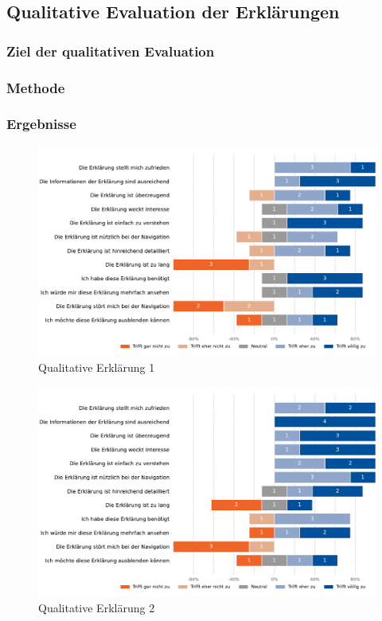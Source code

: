 \subsection{Qualitative Evaluation der Erklärungen}
\label{sec:study_results_qualitativ}

\subsubsection{Ziel der qualitativen Evaluation}

\subsubsection{Methode}

\subsubsection{Ergebnisse}

\begin{figure}[htb!]
    \centering
    \includegraphics[width=\linewidth]{contents/06_model_evaluation/02_evaluation/res/qualitativeFeedback-01_collaborative_routing.pdf}
    \caption{Qualitative Erklärung 1}
    \label{fig:qualitative_evaluation_explanation1}
\end{figure}

\begin{figure}[htb!]
    \centering
    \includegraphics[width=\linewidth]{contents/06_model_evaluation/02_evaluation/res/qualitativeFeedback-02_collaborative_algorithm.pdf}
    \caption{Qualitative Erklärung 2}
    \label{fig:qualitative_evaluation_explanation2}
\end{figure}

